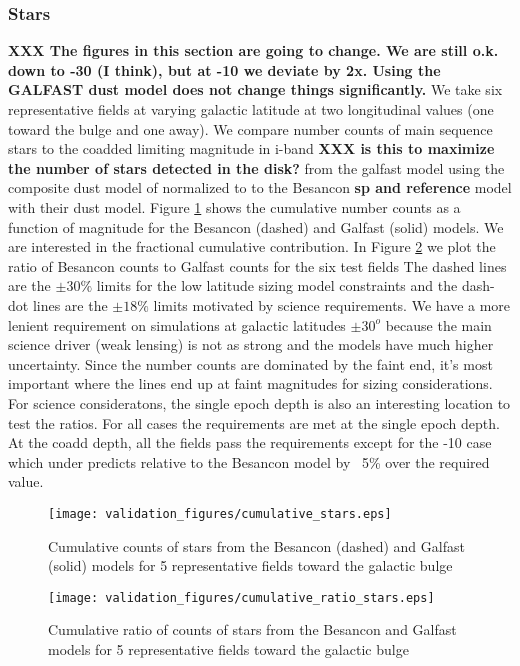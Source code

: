\documentclass[]{article}
\begin{document}
\subsubsection{Stars}
{\bf XXX  The figures in this section are going to change.  We are still o.k. down to -30 (I think), but at -10 we deviate by 2x.  Using the GALFAST dust model
does not change things significantly.}
We take six representative fields at varying galactic latitude at two longitudinal values (one toward the bulge and one away).  We compare number 
counts of main sequence stars to the coadded limiting magnitude in i-band {\bf XXX is this to maximize the number of stars detected in the disk?}
 from the galfast model using the composite dust model
of \cite{amores} normalized to \cite{sfd} to the Besancon {\bf sp and reference} model with their dust model.  Figure \ref{fig:scounts_0} shows 
the cumulative number counts as a function of magnitude for the Besancon (dashed) and Galfast (solid) models.  We are interested in the
fractional cumulative contribution.  In Figure \ref{fig:sratio_0} we plot the ratio of Besancon counts to Galfast counts for the six test fields
The dashed lines are the $\pm30\%$ limits for the low latitude sizing model constraints and the dash-dot lines are the $\pm18\%$ limits motivated
by science requirements.  We have a more lenient requirement on simulations at galactic latitudes $\pm 30^o$ because the main science driver (weak lensing)
is not as strong and the models have much higher uncertainty.  Since the number counts are dominated by the faint end, it's most important where the lines end up at faint magnitudes for 
sizing considerations.  For science consideratons, the single epoch depth is also an interesting location to test the ratios.  For all cases the 
requirements are met at the single epoch depth.  At the coadd depth, all the fields pass the requirements except for the -10 case which under
predicts relative to the Besancon model by ~5\% over the required value.
\begin{figure}
\centering
\texttt{[image: validation\_figures/cumulative\_stars.eps]}
\caption{Cumulative counts of stars from the Besancon (dashed) and Galfast (solid) models for 5 representative fields toward the galactic bulge \label{fig:scounts_0}}
\end{figure}
\begin{figure}
\centering
\texttt{[image: validation\_figures/cumulative\_ratio\_stars.eps]}
\caption{Cumulative ratio of counts of stars from the Besancon and Galfast models for 5 representative fields toward the galactic bulge \label{fig:sratio_0}}
\end{figure}
\end{document}
